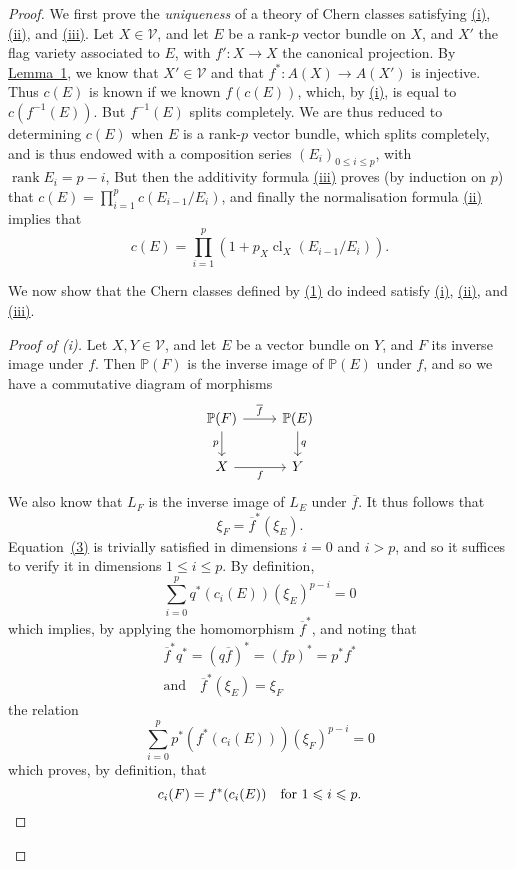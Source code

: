 \documentclass{article}
\renewcommand{\cal}[1]{{\mathcal{#1}}}
\renewcommand{\leq}{\leqslant}
\DeclareMathOperator{\rank}{rank}
\DeclareMathOperator{\cl}{cl}
\newcommand{\oldpage}[1]{\marginpar{\footnotesize$\Big\vert$ \textit{p.~#1}}}
\begin{document}
\begin{proof}
\oldpage{145}
  We first prove the \emph{uniqueness} of a theory of Chern classes satisfying \hyperref[theorem1i]{\rm{(i)}}, \hyperref[theorem1ii]{\rm{(ii)}}, and \hyperref[theorem1iii]{\rm{(iii)}}.
  Let $X\in\cal{V}$, and let $E$ be a rank-$p$ vector bundle on $X$, and $X'$ the flag variety associated to $E$, with $f'\colon X\to X$ the canonical projection.
  By \hyperref[lemma1]{Lemma~1}, we know that $X'\in\cal{V}$ and that $f^*\colon A(X)\to A(X')$ is injective.
  Thus $c(E)$ is known if we known $f(c(E))$, which, by \hyperref[theorem1i]{\rm{(i)}}, is equal to $c(f^{-1}(E))$.
  But $f^{-1}(E)$ splits completely.
  We are thus reduced to determining $c(E)$ when $E$ is a rank-$p$ vector bundle, which splits completely, and is thus endowed with a composition series $(E_i)_{0\leq i\leq p}$, with $\rank E_i=p-i$,
  But then the additivity formula \hyperref[theorem1iii]{\rm{(iii)}} proves (by induction on $p$) that $c(E)=\prod_{i=1}^p c(E_{i-1}/E_i)$, and finally the normalisation formula \hyperref[theorem1ii]{\rm{(ii)}} implies that
  \[
  \label{equation6}
    c(E) = \prod_{i=1}^p (1+p_X\cl_X(E_{i-1}/E_i)).
  \tag{6}
  \]

  We now show that the Chern classes defined by \hyperref[equation1]{(1)} do indeed satisfy \hyperref[theorem1i]{\rm{(i)}}, \hyperref[theorem1ii]{\rm{(ii)}}, and \hyperref[theorem1iii]{\rm{(iii)}}.

  \begin{proof}[Proof of \rm{(i)}]
    Let $X,Y\in\cal{V}$, and let $E$ be a vector bundle on $Y$, and $F$ its inverse image under $f$.
    Then $\mathbb{P}(F)$ is the inverse image of $\mathbb{P}(E)$ under $f$, and so we have a commutative diagram of morphisms
    \[
      \begin{tikzcd}
        \mathbb{P}(F) \rar["\overline{f}"] \dar[swap,"p"]
        & \mathbb{P}(E) \dar["q"]
      \\X \rar[swap,"f"]
        & Y
      \end{tikzcd}
    \]
    We also know that $L_F$ is the inverse image of $L_E$ under $\overline{f}$.
    It thus follows that
    \[
      \xi_F = \overline{f}^*(\xi_E).
    \]
    Equation~\hyperref[equation3]{(3)} is trivially satisfied in dimensions $i=0$ and $i>p$, and so it suffices to verify it in dimensions $1\leq i\leq p$.
    By definition,
    \[
      \sum_{i=0}^p q^*(c_i(E))(\xi_E)^{p-i} = 0
    \]
    which implies, by applying the homomorphism $\overline{f}^*$, and noting that
    \[
      \begin{gathered}
        \overline{f}^*q^* = (q\overline{f})^* = (fp)^* = p^*f^*
      \\\text{and}\quad\overline{f}^*(\xi_E) = \xi_F
      \end{gathered}
    \]
    the relation
    \[
      \sum_{i=0}^p p^*(f^*(c_i(E)))(\xi_F)^{p-i} = 0
    \]
\oldpage{146}
    which proves, by definition, that
    \[
      c_i(F) = f^*(c_i(E))
      \quad\mbox{for $1\leq i\leq p$.}\qedhere
    \]
  \end{proof}


\end{proof}
\end{document}
